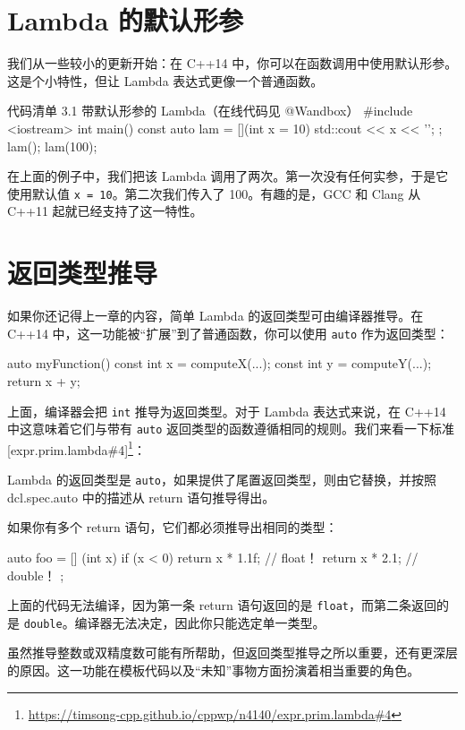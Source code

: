 \section{Lambda 的默认形参}

我们从一些较小的更新开始：在 C++14 中，你可以在函数调用中使用默认形参。这是个小特性，但让 Lambda 表达式更像一个普通函数。

\begin{codeboxt}{代码清单 3.1 带默认形参的 Lambda（在线代码见 @Wandbox）}
#include <iostream>
int main() {
const auto lam = [](int x = 10) { std::cout << x << '\n'; };
lam();
lam(100);
}
\end{codeboxt}

在上面的例子中，我们把该 Lambda 调用了两次。第一次没有任何实参，于是它使用默认值 \texttt{x = 10}。第二次我们传入了 100。有趣的是，GCC 和 Clang 从 C++11 起就已经支持了这一特性。

\section{返回类型推导}

如果你还记得上一章的内容，简单 Lambda 的返回类型可由编译器推导。在 C++14 中，这一功能被“扩展”到了普通函数，你可以使用 \texttt{auto} 作为返回类型：

\begin{codebox}
auto myFunction() {
const int x = computeX(...);
const int y = computeY(...);
return x + y;
}
\end{codebox}

上面，编译器会把 \texttt{int} 推导为返回类型。对于 Lambda 表达式来说，在 C++14 中这意味着它们与带有 \texttt{auto} 返回类型的函数遵循相同的规则。我们来看一下标准 [expr.prim.lambda\#4]\footnote{\url{https://timsong-cpp.github.io/cppwp/n4140/expr.prim.lambda\#4}}：

Lambda 的返回类型是 \texttt{auto}，如果提供了尾置返回类型，则由它替换，并按照 dcl.spec.auto 中的描述从 return 语句推导得出。

如果你有多个 return 语句，它们都必须推导出相同的类型：

\begin{codebox}
auto foo = [] (int x) {
if (x < 0) return x * 1.1f; // float！
return x * 2.1;
// double！
};
\end{codebox}

上面的代码无法编译，因为第一条 return 语句返回的是 \texttt{float}，而第二条返回的是 \texttt{double}。编译器无法决定，因此你只能选定单一类型。

虽然推导整数或双精度数可能有所帮助，但返回类型推导之所以重要，还有更深层的原因。这一功能在模板代码以及“未知”事物方面扮演着相当重要的角色。


